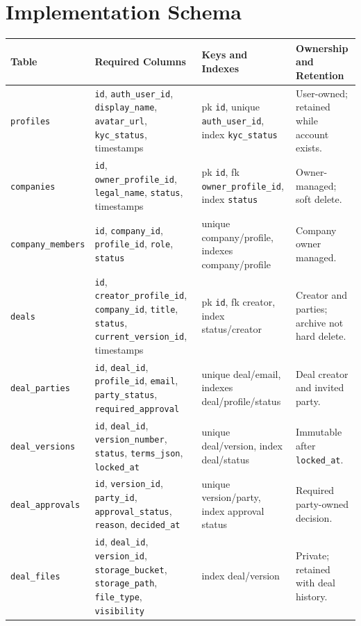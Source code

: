 \section{Implementation Schema}
\begin{longtable}{p{}p{}p{}p{}}
\toprule
Table & Required Columns & Keys and Indexes & Ownership and Retention \\
\midrule
\texttt{profiles} & \texttt{id}, \texttt{auth\_user\_id}, \texttt{display\_name}, \texttt{avatar\_url}, \texttt{kyc\_status}, timestamps & pk \texttt{id}, unique \texttt{auth\_user\_id}, index \texttt{kyc\_status} & User-owned; retained while account exists. \\
\texttt{companies} & \texttt{id}, \texttt{owner\_profile\_id}, \texttt{legal\_name}, \texttt{status}, timestamps & pk \texttt{id}, fk \texttt{owner\_profile\_id}, index \texttt{status} & Owner-managed; soft delete. \\
\texttt{company\_members} & \texttt{id}, \texttt{company\_id}, \texttt{profile\_id}, \texttt{role}, \texttt{status} & unique company/profile, indexes company/profile & Company owner managed. \\
\texttt{deals} & \texttt{id}, \texttt{creator\_profile\_id}, \texttt{company\_id}, \texttt{title}, \texttt{status}, \texttt{current\_version\_id}, timestamps & pk \texttt{id}, fk creator, index status/creator & Creator and parties; archive not hard delete. \\
\texttt{deal\_parties} & \texttt{id}, \texttt{deal\_id}, \texttt{profile\_id}, \texttt{email}, \texttt{party\_status}, \texttt{required\_approval} & unique deal/email, indexes deal/profile/status & Deal creator and invited party. \\
\texttt{deal\_versions} & \texttt{id}, \texttt{deal\_id}, \texttt{version\_number}, \texttt{status}, \texttt{terms\_json}, \texttt{locked\_at} & unique deal/version, index deal/status & Immutable after \texttt{locked\_at}. \\
\texttt{deal\_approvals} & \texttt{id}, \texttt{version\_id}, \texttt{party\_id}, \texttt{approval\_status}, \texttt{reason}, \texttt{decided\_at} & unique version/party, index approval status & Required party-owned decision. \\
\texttt{deal\_files} & \texttt{id}, \texttt{deal\_id}, \texttt{version\_id}, \texttt{storage\_bucket}, \texttt{storage\_path}, \texttt{file\_type}, \texttt{visibility} & index deal/version & Private; retained with deal history. \\

\end{longtable}
